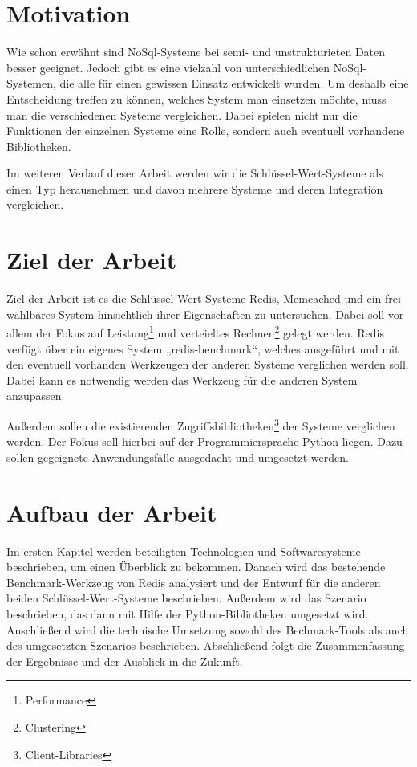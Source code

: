 \section{Motivation}

Wie schon erwähnt sind NoSql-Systeme bei semi- und unstrukturieten Daten besser
geeignet. Jedoch gibt es eine vielzahl von unterschiedlichen NoSql-Systemen,
die alle für einen gewissen Einsatz entwickelt wurden. Um deshalb eine
Entscheidung treffen zu können, welches System man einsetzen möchte, muss man
die verschiedenen Systeme vergleichen. Dabei spielen nicht nur die Funktionen
der einzelnen Systeme eine Rolle, sondern auch eventuell vorhandene
Bibliotheken.

Im weiteren Verlauf dieser Arbeit werden wir die Schlüssel-Wert-Systeme als einen
Typ herausnehmen und davon mehrere Systeme und deren Integration vergleichen.

\section{Ziel der Arbeit}

Ziel der Arbeit ist es die Schlüssel-Wert-Systeme Redis, Memcached und ein frei
wählbares System hinsichtlich ihrer Eigenschaften zu untersuchen. Dabei soll
vor allem der Fokus auf Leistung\footnote{Performance} und verteieltes
Rechnen\footnote{Clustering} gelegt werden. Redis verfügt über ein
eigenes System „redis-benchmark“, welches ausgeführt und mit den eventuell
vorhanden Werkzeugen der anderen Systeme verglichen werden soll. Dabei kann es
notwendig werden das Werkzeug für die anderen System anzupassen.

Außerdem sollen die existierenden
Zugriffsbibliotheken\footnote{Client-Libraries} der Systeme verglichen
werden. Der Fokus soll hierbei auf der Programmiersprache Python liegen. Dazu
sollen gegeignete Anwendungsfälle ausgedacht und umgesetzt werden.

\section{Aufbau der Arbeit}

Im ersten Kapitel werden beteiligten Technologien und Softwaresysteme
beschrieben, um einen Überblick zu bekommen. Danach wird das bestehende
Benchmark-Werkzeug von Redis analysiert und der Entwurf für die anderen beiden
Schlüssel-Wert-Systeme beschrieben. Außerdem wird das Szenario beschrieben, das
dann mit Hilfe der Python-Bibliotheken umgesetzt wird. Anschließend wird die
technische Umsetzung sowohl des Bechmark-Tools als auch des umgesetzten
Szenarios beschrieben. Abschließend folgt die Zusammenfassung der Ergebnisse
und der Ausblick in die Zukunft.
